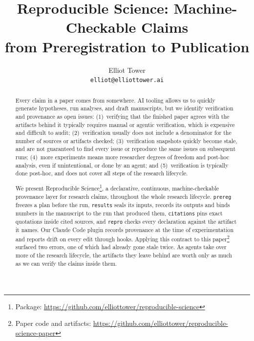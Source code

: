\documentclass{article}
\title{Reproducible Science: Machine-Checkable Claims\\from Preregistration to Publication}
\author{Elliot Tower\\\texttt{elliot@elliottower.ai}}
\date{}
\newcommand{\code}[1]{\texttt{#1}}
\newcommand{\tPlan}{\code{prereg}}
\newcommand{\tRun}{\code{results}}
\newcommand{\tCite}{\code{citations}}
\newcommand{\tVerify}{\code{repro}}
\begin{document}
\maketitle

\begin{abstract}
Every claim in a paper comes from somewhere. AI tooling allows us to quickly generate hypotheses,
run analyses, and draft manuscripts, but we identify verification and provenance as open issues:
(1)~verifying that the finished paper agrees with the artifacts behind it typically requires
manual or agentic verification, which is expensive and difficult to audit; (2)~verification
usually does not include a denominator for the number of sources or artifacts checked;
(3)~verification snapshots quickly become stale, and are not guaranteed to find every issue or
reproduce the same issues on subsequent runs; (4)~more experiments means more researcher degrees
of freedom and post-hoc analysis, even if unintentional, or done by an agent; and
(5)~verification is typically done post-hoc, and does not cover all steps of the research
lifecycle.

We present Reproducible Science\footnote{Package: \url{https://github.com/elliottower/reproducible-science}}, a declarative, continuous, machine-checkable provenance layer
for research claims, throughout the whole research lifecycle. \tPlan{} freezes a plan before the
run, \tRun{} seals its inputs, records its outputs and binds numbers in the manuscript to the run
that produced them, \tCite{} pins exact quotations inside cited sources, and \tVerify{} checks
every declaration against the artifact it names. Our Claude Code plugin records provenance at the
time of experimentation and reports drift on every edit through hooks. Applying this contract to
this paper\footnote{Paper code and artifacts: \url{https://github.com/elliottower/reproducible-science-paper}} surfaced two errors, one of which had already gone stale twice. As agents take over more
of the research lifecycle, the artifacts they leave behind are worth only as much as we can verify
the claims inside them.
\end{abstract}
\end{document}
